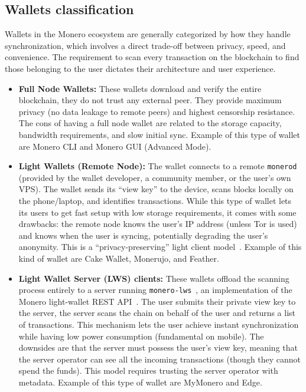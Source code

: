 \documentclass[conference]{IEEEtran}
\begin{document}
\subsection{Wallets classification}
Wallets in the Monero ecosystem are generally categorized by how they handle synchronization, which involves a direct trade-off between privacy, speed, and convenience. The requirement to scan every transaction on the blockchain to find those belonging to the user dictates their architecture and user experience.
\begin{itemize}
\item \textbf{Full Node Wallets:} These wallets download and verify the entire blockchain, they do not trust any external peer. They provide maximum privacy (no data leakage to remote peers) and highest censorship resistance. The cons of having a full node wallet are related to the storage capacity, bandwidth requirements, and slow initial sync. Example of this type of wallet are Monero CLI and Monero GUI (Advanced Mode).~\cite{monero_wallets}
\item \textbf{Light Wallets (Remote Node):} The wallet connects to a remote \texttt{monerod} (provided by the wallet developer, a community member, or the user's own VPS). The wallet sends its ``view key'' to the device, scans blocks locally on the phone/laptop, and identifies transactions. While this type of wallet lets its users to get fast setup with low storage requirements, it comes with some drawbacks: the remote node knows the user's IP address (unless Tor is used) and knows when the user is syncing, potentially degrading the user's anonymity. This is a ``privacy-preserving'' light client model~\cite{connect_gui_wallet_to_remote_node}. Example of this kind of wallet are Cake Wallet, Monerujo, and Feather.~\cite{monero_wallets}
\item \textbf{Light Wallet Server (LWS) clients:} These wallets offload the scanning process entirely to a server running \texttt{monero-lws}~\cite{monero_lws}, an implementation of the Monero light-wallet REST API~\cite{monero_lightwallet_api}. The user submits their private view key to the server, the server scans the chain on behalf of the user and returns a list of transactions. This mechanism lets the user achieve instant synchronization while having low power consumption (fundamental on mobile). The downsides are that the server must possess the user's view key, meaning that the server operator can see all the incoming transactions (though they cannot spend the funds). This model requires trusting the server operator with metadata. Example of this type of wallet are MyMonero and Edge.~\cite{monero_truenas}
\end{itemize}
\end{document}
